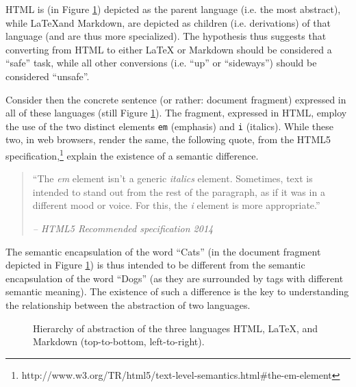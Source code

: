 \documentclass{scrreprt}
\begin{document}
HTML is (in Figure \ref{fig:hierarchy-of-abstraction-example-tree}) depicted as the parent language (i.e. the most abstract), while \LaTeX and Markdown, are depicted as children (i.e. derivations) of that language (and are thus more specialized). The hypothesis thus suggests that converting from HTML to either \LaTeX{} or Markdown should be considered a ``safe'' task, while all other conversions (i.e. ``up'' or ``sideways'') should be considered ``unsafe''.

Consider then the concrete sentence (or rather: document fragment) expressed in all of these languages (still Figure \ref{fig:hierarchy-of-abstraction-example-tree}). The fragment, expressed in HTML, employ the use of the two distinct elements \texttt{em} (emphasis) and \texttt{i} (italics). While these two, in web browsers, render the same, the following quote, from the HTML5 specification,\footnote{ http://www.w3.org/TR/html5/text-level-semantics.html\#the-em-element} explain the existence of a semantic difference.

\begin{quote}
``The \emph{em} element isn't a generic \emph{italics} element. Sometimes, text is intended to stand out from the rest of the paragraph, as if it was in a different mood or voice. For this, the \emph{i} element is more appropriate.''
\begin{flushright}
\textit{-- HTML5 Recommended specification 2014}
\end{flushright}
\end{quote}

The semantic encapsulation of the word ``Cats'' (in the document fragment depicted in Figure \ref{fig:hierarchy-of-abstraction-example-tree}) is thus intended to be different from the semantic encapsulation of the word ``Dogs'' (as they are surrounded by tags with different semantic meaning). The existence of such a difference is the key to understanding the relationship between the abstraction of two languages.

\begin{figure}[h]
  \centering

  \caption{Hierarchy of abstraction of the three languages HTML, \LaTeX, and Markdown (top-to-bottom, left-to-right).}
  \label{fig:hierarchy-of-abstraction-example-tree}
\end{figure}
\end{document}
